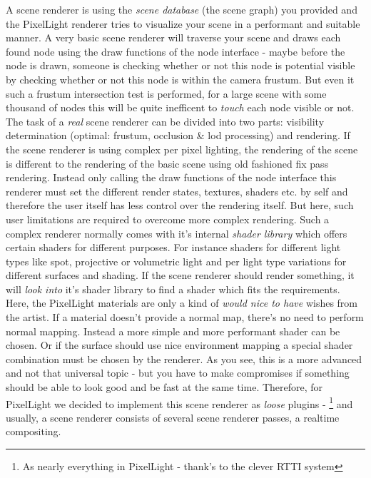 A scene renderer is using the \emph{scene database} (the scene graph) you provided and the PixelLight renderer tries to visualize your scene in a performant and suitable manner. A very basic scene renderer will traverse your scene and draws each found node using the draw functions of the node interface - maybe before the node is drawn, someone is checking whether or not this node is potential visible by checking whether or not this node is within the camera frustum. But even it such a frustum intersection test is performed, for a large scene with some thousand of nodes this will be quite inefficent to \emph{touch} each node visible or not. The task of a \emph{real} scene renderer can be divided into two parts: visibility determination (optimal: frustum, occlusion \& lod processing) and rendering. If the scene renderer is using complex per pixel lighting, the rendering of the scene is different to the rendering of the basic scene using old fashioned fix pass rendering. Instead only calling the draw functions of the node interface this renderer must set the different render states, textures, shaders etc. by self and therefore the user itself has less control over the rendering itself. But here, such user limitations are required to overcome more complex rendering. Such a complex renderer normally comes with it's internal \emph{shader library} which offers certain shaders for different purposes. For instance shaders for different light types like spot, projective or volumetric light and per light type variations for different surfaces and shading. If the scene renderer should render something, it will \emph{look into} it's shader library to find a shader which fits the requirements. Here, the PixelLight materials are only a kind of \emph{would nice to have} wishes from the artist. If a material doesn't provide a normal map, there's no need to perform normal mapping. Instead a more simple and more performant shader can be chosen. Or if the surface should use nice environment mapping a special shader combination must be chosen by the renderer. As you see, this is a more advanced and not that universal topic - but  you have to make compromises if something should be able to look good and be fast at the same time. Therefore, for PixelLight we decided to implement this scene renderer as \emph{loose} plugins - \footnote{As nearly everything in PixelLight - thank's to the clever \ac{RTTI} system} and usually, a scene renderer consists of several scene renderer passes, a realtime compositing.

